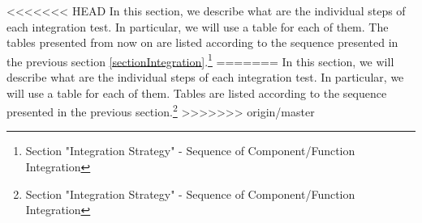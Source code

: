 <<<<<<< HEAD
In this section, we describe what are the individual steps of each integration test. In particular, we will use a table for each of them. \newline
The tables presented from now on are listed according to the sequence presented in the previous section \ref{sectionIntegration}.\footnote{Section "Integration Strategy" - Sequence of Component/Function Integration}
=======
In this section, we will describe what are the individual steps of each integration test. In particular, we will use a table for each of them. \newline
Tables are listed according to the sequence presented in the previous section.\footnote{Section "Integration Strategy" - Sequence of Component/Function Integration}
>>>>>>> origin/master



